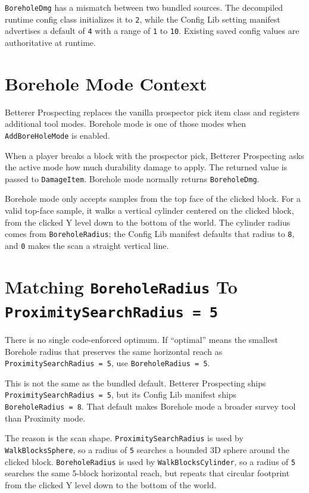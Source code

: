\documentclass[
  11pt,
  letterpaper,
  titlepage]{article}
\begin{document}
\texttt{BoreholeDmg} has a mismatch between two bundled sources. The
decompiled runtime config class initializes it to \texttt{2}, while the
Config Lib setting manifest advertises a default of \texttt{4} with a
range of \texttt{1} to \texttt{10}. Existing saved config values are
authoritative at runtime.

\section{Borehole Mode Context}\label{borehole-mode-context}

Betterer Prospecting replaces the vanilla prospector pick item class and
registers additional tool modes. Borehole mode is one of those modes
when \texttt{AddBoreHoleMode} is enabled.

When a player breaks a block with the prospector pick, Betterer
Prospecting asks the active mode how much durability damage to apply.
The returned value is passed to \texttt{DamageItem}. Borehole mode
normally returns \texttt{BoreholeDmg}.

Borehole mode only accepts samples from the top face of the clicked
block. For a valid top-face sample, it walks a vertical cylinder
centered on the clicked block, from the clicked Y level down to the
bottom of the world. The cylinder radius comes from
\texttt{BoreholeRadius}; the Config Lib manifest defaults that radius to
\texttt{8}, and \texttt{0} makes the scan a straight vertical line.

\section{\texorpdfstring{Matching \texttt{BoreholeRadius} To
\texttt{ProximitySearchRadius\ =\ 5}}{Matching BoreholeRadius To ProximitySearchRadius = 5}}\label{matching-boreholeradius-to-proximitysearchradius-5}

There is no single code-enforced optimum. If ``optimal'' means the
smallest Borehole radius that preserves the same horizontal reach as
\texttt{ProximitySearchRadius\ =\ 5}, use \texttt{BoreholeRadius\ =\ 5}.

This is not the same as the bundled default. Betterer Prospecting ships
\texttt{ProximitySearchRadius\ =\ 5}, but its Config Lib manifest ships
\texttt{BoreholeRadius\ =\ 8}. That default makes Borehole mode a
broader survey tool than Proximity mode.

The reason is the scan shape. \texttt{ProximitySearchRadius} is used by
\texttt{WalkBlocksSphere}, so a radius of \texttt{5} searches a bounded
3D sphere around the clicked block. \texttt{BoreholeRadius} is used by
\texttt{WalkBlocksCylinder}, so a radius of \texttt{5} searches the same
5-block horizontal reach, but repeats that circular footprint from the
clicked Y level down to the bottom of the world.
\end{document}
